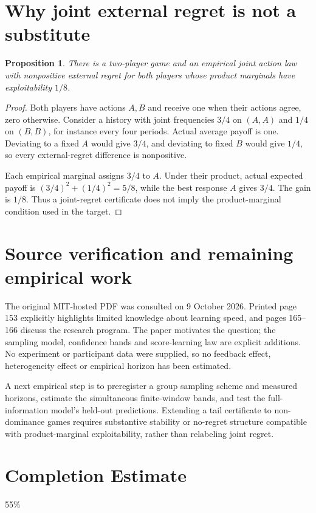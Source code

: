 \documentclass[11pt]{article}
\newtheorem{proposition}[theorem]{Proposition}
\theoremstyle{remark}
\begin{document}
\section{Why joint external regret is not a substitute}
\begin{proposition}\label{regret}
There is a two-player game and an empirical joint action law with nonpositive external regret for both players whose product marginals have exploitability $1/8$.
\end{proposition}
\begin{proof}
Both players have actions $A,B$ and receive one when their actions agree, zero otherwise. Consider a history with joint frequencies $3/4$ on $(A,A)$ and $1/4$ on $(B,B)$, for instance every four periods. Actual average payoff is one. Deviating to a fixed $A$ would give $3/4$, and deviating to fixed $B$ would give $1/4$, so every external-regret difference is nonpositive.

Each empirical marginal assigns $3/4$ to $A$. Under their product, actual expected payoff is $(3/4)^2+(1/4)^2=5/8$, while the best response $A$ gives $3/4$. The gain is $1/8$. Thus a joint-regret certificate does not imply the product-marginal condition used in the target.
\end{proof}

\section{Source verification and remaining empirical work}
The original MIT-hosted PDF was consulted on 9 October 2026. Printed page 153 explicitly highlights limited knowledge about learning speed, and pages 165--166 discuss the research program. The paper motivates the question; the sampling model, confidence bands and score-learning law are explicit additions. No experiment or participant data were supplied, so no feedback effect, heterogeneity effect or empirical horizon has been estimated.

A next empirical step is to preregister a group sampling scheme and measured horizons, estimate the simultaneous finite-window bands, and test the full-information model's held-out predictions. Extending a tail certificate to non-dominance games requires substantive stability or no-regret structure compatible with product-marginal exploitability, rather than relabeling joint regret.

\section{Completion Estimate}
55\%
\end{document}
